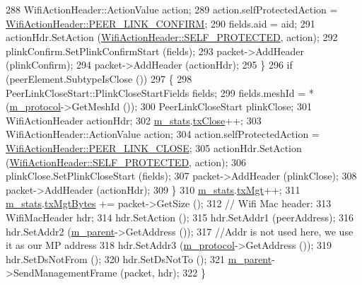 \begin{DoxyCode}
288       WifiActionHeader::ActionValue action;
289       action.selfProtectedAction = \hyperlink{classns3_1_1WifiActionHeader_a17cfd6c8f685a44e7b7b832cc9a53e83a89961b879d58204ada067ee8dbbde06e}{WifiActionHeader::PEER\_LINK\_CONFIRM}; 
290       fields.aid = aid;
291       actionHdr.SetAction (\hyperlink{classns3_1_1WifiActionHeader_a5402becd11b4077f22d76c4d0d923358a0d41e6327b2a9ae590e3020f378e40e4}{WifiActionHeader::SELF\_PROTECTED}, action); 
292       plinkConfirm.SetPlinkConfirmStart (fields);
293       packet->AddHeader (plinkConfirm);
294       packet->AddHeader (actionHdr);
295     \}
296   \textcolor{keywordflow}{if} (peerElement.SubtypeIsClose ())
297     \{
298       PeerLinkCloseStart::PlinkCloseStartFields fields;
299       fields.meshId = *(\hyperlink{classns3_1_1dot11s_1_1PeerManagementProtocolMac_afbdd1f31cd54c320267ffb3426559095}{m\_protocol}->GetMeshId ());
300       PeerLinkCloseStart plinkClose;
301       WifiActionHeader actionHdr;
302       \hyperlink{classns3_1_1dot11s_1_1PeerManagementProtocolMac_aaaccd87941623a8bff20e8998908b518}{m\_stats}.\hyperlink{structns3_1_1dot11s_1_1PeerManagementProtocolMac_1_1Statistics_a7f74d573fa1dd232091d43a96294b188}{txClose}++;
303       WifiActionHeader::ActionValue action;
304       action.selfProtectedAction = \hyperlink{classns3_1_1WifiActionHeader_a17cfd6c8f685a44e7b7b832cc9a53e83a809630e6f0c535ffe43ea071edacc7fd}{WifiActionHeader::PEER\_LINK\_CLOSE}; 
305       actionHdr.SetAction (\hyperlink{classns3_1_1WifiActionHeader_a5402becd11b4077f22d76c4d0d923358a0d41e6327b2a9ae590e3020f378e40e4}{WifiActionHeader::SELF\_PROTECTED}, action); 
306       plinkClose.SetPlinkCloseStart (fields);
307       packet->AddHeader (plinkClose);
308       packet->AddHeader (actionHdr);
309     \}
310   \hyperlink{classns3_1_1dot11s_1_1PeerManagementProtocolMac_aaaccd87941623a8bff20e8998908b518}{m\_stats}.\hyperlink{structns3_1_1dot11s_1_1PeerManagementProtocolMac_1_1Statistics_aca8d471dcea8a661adac26f971ccbd36}{txMgt}++;
311   \hyperlink{classns3_1_1dot11s_1_1PeerManagementProtocolMac_aaaccd87941623a8bff20e8998908b518}{m\_stats}.\hyperlink{structns3_1_1dot11s_1_1PeerManagementProtocolMac_1_1Statistics_a6fb1958b783dd095597f2c66c5276f01}{txMgtBytes} += packet->GetSize ();
312   \textcolor{comment}{// Wifi Mac header:}
313   WifiMacHeader hdr;
314   hdr.SetAction ();
315   hdr.SetAddr1 (peerAddress);
316   hdr.SetAddr2 (\hyperlink{classns3_1_1dot11s_1_1PeerManagementProtocolMac_a14edf9af29af164f967ccc6e77d8ea03}{m\_parent}->GetAddress ());
317   \textcolor{comment}{//Addr is not used here, we use it as our MP address}
318   hdr.SetAddr3 (\hyperlink{classns3_1_1dot11s_1_1PeerManagementProtocolMac_afbdd1f31cd54c320267ffb3426559095}{m\_protocol}->GetAddress ());
319   hdr.SetDsNotFrom ();
320   hdr.SetDsNotTo ();
321   \hyperlink{classns3_1_1dot11s_1_1PeerManagementProtocolMac_a14edf9af29af164f967ccc6e77d8ea03}{m\_parent}->SendManagementFrame (packet, hdr);
322 \}
\end{DoxyCode}


